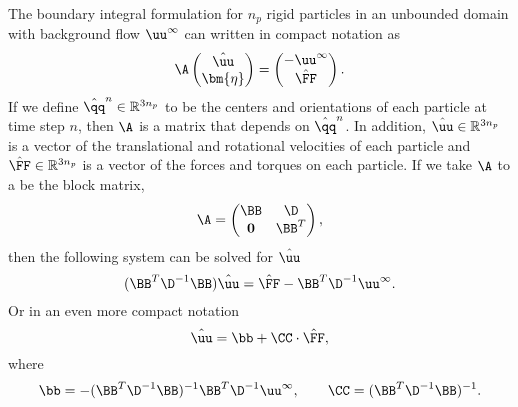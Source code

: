The boundary integral formulation for $n_p$ rigid particles in an unbounded domain with background flow $\uu^\infty$ can written in compact notation as
\[ \A \begin{pmatrix} \hat{\uu} \\ \bm{\eta}\end{pmatrix} = \begin{pmatrix} -\uu^{\infty} \\  \hat{\FF}\end{pmatrix}. \]
If we define $\hat{\qq}^n\in \mathbb{R}^{3n_p}$ to be the centers and orientations of each particle at time step $n$, then $\A$ is a matrix that depends on $\hat{\qq}^n$. In addition, $\hat{\uu}\in \mathbb{R}^{3n_p}$ is a vector of the translational and rotational velocities of each particle and $\hat{\FF}\in\mathbb{R}^{3n_p}$ is a vector of the forces and torques on each particle. If we take $\A$ to a be the block matrix,
\[ \A = \begin{pmatrix} \BB & \D\\ \mathbf{0} & \BB^T\end{pmatrix},\]
then the following system can be solved for $\hat{\uu}$
\[(\BB^T \D^{-1}\BB)\hat{\uu} = \hat{\FF} - \BB^T\D^{-1}\uu^\infty.\]
Or in an even more compact notation 
\[ \hat{\uu} =  \bb + \CC\cdot\hat{\FF} ,\]
where 
\[ \bb = - (\BB^T \D^{-1}\BB)^{-1}\BB^T\D^{-1}\uu^\infty, \qquad \CC =  (\BB^T \D^{-1}\BB)^{-1}.\]

